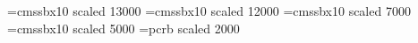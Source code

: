 
\pagecolor{mybackgroundcolor}

\font \riesig=cmssbx10 scaled 13000
\font \gigant=cmssbx10 scaled 12000
\font \gross=cmssbx10 scaled 7000
\font \mittel=cmssbx10 scaled 5000
\font \courier=pcrb scaled 2000

\newcommand{\myFooter}{}
\newcommand{\myNewSlide}{\newpage\myFooter} %

\usepackage{url}
\usepackage{hyperref}
\hypersetup{backref,  linkcolor=black, citecolor=black, colorlinks=true, hyperindex=true}
